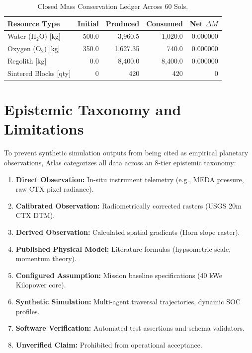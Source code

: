 \documentclass[10pt,journal,compsoc,twocolumn]{article}
\begin{document}
\begin{table}[h]
\centering
\caption{Closed Mass Conservation Ledger Across 60 Sols.}
\label{tab:mass_balance}
\small
\begin{tabular}{lrrrr}
\toprule
\textbf{Resource Type} & \textbf{Initial} & \textbf{Produced} & \textbf{Consumed} & \textbf{Net $\Delta M$} \\
\midrule
Water ($\text{H}_2\text{O}$) [kg] & 500.0 & 3,960.5 & 1,020.0 & 0.000000 \\
Oxygen ($\text{O}_2$) [kg] & 350.0 & 1,627.35 & 740.0 & 0.000000 \\
Regolith [kg] & 0.0 & 8,400.0 & 8,400.0 & 0.000000 \\
Sintered Blocks [qty] & 0 & 420 & 420 & 0 \\
\bottomrule
\end{tabular}
\end{table}

\section{Epistemic Taxonomy and Limitations}
To prevent synthetic simulation outputs from being cited as empirical planetary observations, Atlas categorizes all data across an 8-tier epistemic taxonomy:
\begin{enumerate}
    \item \textbf{Direct Observation:} In-situ instrument telemetry (e.g., MEDA pressure, raw CTX pixel radiance).
    \item \textbf{Calibrated Observation:} Radiometrically corrected rasters (USGS 20m CTX DTM).
    \item \textbf{Derived Observation:} Calculated spatial gradients (Horn slope raster).
    \item \textbf{Published Physical Model:} Literature formulas (hypsometric scale, momentum theory).
    \item \textbf{Configured Assumption:} Mission baseline specifications (40 kWe Kilopower core).
    \item \textbf{Synthetic Simulation:} Multi-agent traversal trajectories, dynamic SOC profiles.
    \item \textbf{Software Verification:} Automated test assertions and schema validators.
    \item \textbf{Unverified Claim:} Prohibited from operational acceptance.
\end{enumerate}
\end{document}
